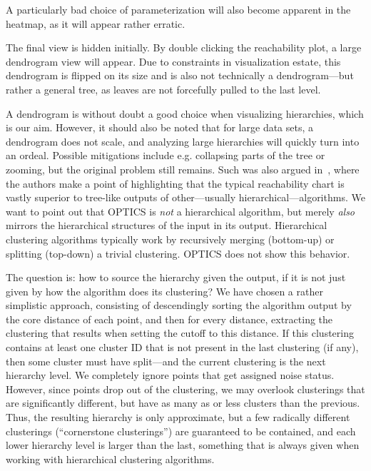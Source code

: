 \documentclass{vgtc} %
\begin{document}
A particularly bad choice of parameterization will also become apparent in the
heatmap, as it will appear rather erratic.

The final view is hidden initially. By double clicking the reachability plot, a
large dendrogram view will appear. Due to constraints in visualization estate,
this dendrogram is flipped on its size and is also not technically a dendrogram---but
rather a general tree, as leaves are not forcefully pulled to the last level.

A dendrogram is without doubt a good choice when visualizing hierarchies, which
is our aim. However, it should also be noted that for large data sets, a
dendrogram does not scale, and analyzing large hierarchies will quickly turn
into an ordeal. Possible mitigations include e.g. collapsing parts of the tree
or zooming, but the original problem still remains. Such was also argued
in~\cite{optics}, where the authors make a point of highlighting that the
typical reachability chart is vastly superior to tree-like outputs of
other---usually hierarchical---algorithms. We want to point out that OPTICS is
\emph{not} a hierarchical algorithm, but merely \emph{also} mirrors the
hierarchical structures of the input in its output. Hierarchical clustering
algorithms typically work by recursively merging (bottom-up) or splitting
(top-down) a trivial clustering. OPTICS does not show this behavior.

The question is: how to source the hierarchy given the output, if it is not
just given by how the algorithm does its clustering? We have chosen a rather
simplistic approach, consisting of descendingly sorting the algorithm output by
the core distance of each point, and then for every distance, extracting the
clustering that results when setting the cutoff to this distance. If this
clustering contains at least one cluster ID that is not present in the last
clustering (if any), then some cluster must have split---and the current
clustering is the next hierarchy level. We completely ignore points that get
assigned noise status. However, since points drop out of the clustering, we
may overlook clusterings that are significantly different, but have as many as
or less clusters than the previous. Thus, the resulting hierarchy is only
approximate, but a few radically different clusterings (``cornerstone
clusterings'') are guaranteed to be contained, and each lower hierarchy level
is larger than the last, something that is always given when working with
hierarchical clustering algorithms.
\end{document}
